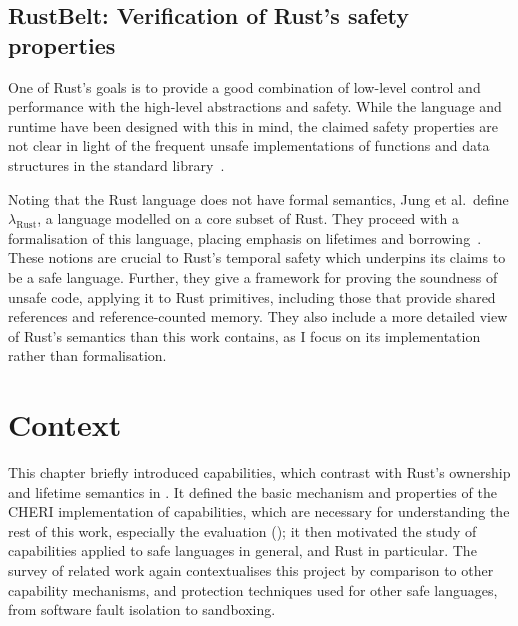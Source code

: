 \documentclass[dissertation.tex]{subfiles}
\begin{document}
\subsection{RustBelt: Verification of Rust's safety properties}

One of Rust's goals is to provide a good combination of low-level
control and performance with the high-level abstractions and safety.
While the language and runtime have been designed with this in mind,
the claimed safety properties are not clear in light of the frequent
unsafe implementations of functions and data structures in the standard
library~\cite{rustbelt-web}.

Noting that the Rust language does not have formal semantics, Jung et
al.\ define \(\lambda_\textrm{Rust}\), a language modelled on a core
subset of Rust.
They proceed with a formalisation of this language, placing emphasis on
lifetimes and borrowing~\cite{jung-rustbelt}.
These notions are crucial to Rust's temporal safety which underpins
its claims to be a safe language.
Further, they give a framework for proving the soundness of unsafe code,
applying it to Rust primitives, including those that provide shared
references and reference-counted memory.
They also include a more detailed view of Rust's semantics than this
work contains, as I focus on its implementation rather than
formalisation.


\section{Context}
This chapter briefly introduced capabilities, which
contrast with Rust's ownership and lifetime semantics in
.
It defined the basic mechanism and properties of the CHERI
implementation of capabilities, which are necessary for understanding
the rest of this work, especially the evaluation ();
it then motivated the study of capabilities applied to safe languages
in general, and Rust in particular.
The survey of related work again contextualises this project by
comparison to other capability mechanisms, and protection techniques
used for other safe languages, from software fault isolation to
sandboxing.
\end{document}
